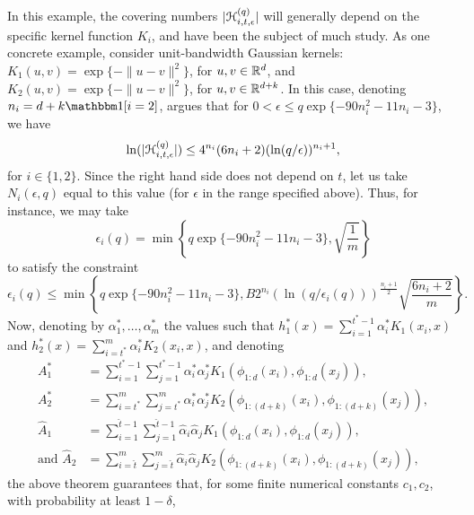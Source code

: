 \documentclass{article}
\begin{document}
In this example, the covering numbers $|\mathcal H_{i,t,\epsilon}^{(q)}|$ will generally depend on the specific kernel function $K_{i}$,
and have been the subject of much study.  As one concrete example, consider unit-bandwidth Gaussian kernels:
$K_{1}(u,v) = \exp\{ - \|u - v\|^{2} \}$, for $u,v \in \mathbb{R}^{d}$, and $K_{2}(u,v) = \exp\{ - \|u-v\|^{2} \}$, for $u,v \in \mathbb{R}^{d+k}$.
In this case, denoting $n_{i} = d + k \ind[i=2]$,
\cite{zhou:02} argues that for $0 < \epsilon \leq q \exp\{ - 90 n_{i}^{2} - 11 n_{i} - 3 \}$, we have 
\begin{equation*}
\ln(|\mathcal H_{i,t,\epsilon}^{(q)}|) \leq 4^{n_{i}} (6 n_{i} + 2)( \ln(q/\epsilon) )^{n_{i}+1},
\end{equation*}
for $i \in \{1,2\}$.
Since the right hand side does not depend on $t$, let us take $N_{i}(\epsilon,q)$ equal to this value (for $\epsilon$ in the range specified above).
Thus, for instance, we may take 
\begin{equation*}
\epsilon_{i}(q) = \min\left\{ q \exp\{ - 90 n_{i}^{2} - 11 n_{i} - 3 \}, \sqrt{\frac{1}{m}} \right\}
\end{equation*}
to satisfy the constraint
\begin{equation*}
\epsilon_{i}(q) \leq \min\left\{ q \exp\{ - 90 n_{i}^{2} - 11 n_{i} - 3 \},  B 2^{n_{i}} ( \ln(q/\epsilon_{i}(q)) )^{\frac{n_{i}+1}{2}} \sqrt{ \frac{6 n_{i} + 2}{m} } \right\}.
\end{equation*}
Now, denoting by $\alpha_{1}^{*},\ldots,\alpha_{m}^{*}$ the values such that $h_{1}^{*}(x) = \sum_{i=1}^{t^{*}-1} \alpha_{i}^{*} K_{1}(x_{i},x)$ and $h_{2}^{*}(x) = \sum_{i=t^{*}}^{m} \alpha_{i}^{*} K_{2}(x_{i},x)$,
and denoting 
\begin{align*}
A_{1}^{*} & = \sum_{i=1}^{t^{*}-1} \sum_{j=1}^{t^{*}-1} \alpha_{i}^{*} \alpha_{j}^{*} K_{1}(\phi_{1:d}(x_{i}),\phi_{1:d}(x_{j})), 
\\ A_{2}^{*} & = \sum_{i=t^{*}}^{m} \sum_{j=t^{*}}^{m} \alpha_{i}^{*} \alpha_{j}^{*} K_{2}(\phi_{1:(d+k)}(x_{i}),\phi_{1:(d+k)}(x_{j})),
\\ \hat{A}_{1} & = \sum_{i=1}^{\hat{t}-1} \sum_{j=1}^{\hat{t}-1} \hat{\alpha}_{i} \hat{\alpha}_{j} K_{1}(\phi_{1:d}(x_{i}),\phi_{1:d}(x_{j})),
\\ \text{and } \hat{A}_{2} & = \sum_{i=\hat{t}}^{m} \sum_{j=\hat{t}}^{m} \hat{\alpha}_{i} \hat{\alpha}_{j} K_{2}(\phi_{1:(d+k)}(x_{i}),\phi_{1:(d+k)}(x_{j})),
\end{align*}
the above theorem guarantees that, for some finite numerical constants $c_{1},c_{2}$, with probability at least $1-\delta$, 
\end{document}

